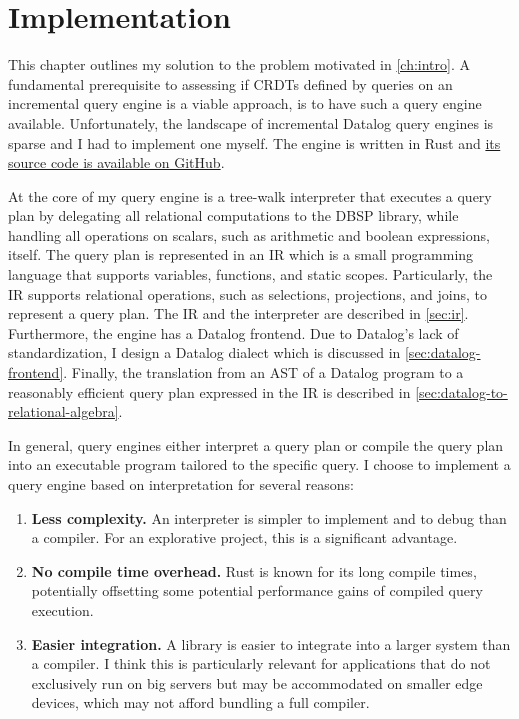 
\chapter{Implementation}\label{ch:implementation}

This chapter outlines my solution to the problem motivated in \ref{ch:intro}.
A fundamental prerequisite to assessing if \acp{CRDT} defined by queries on an
incremental query engine is a viable approach, is to have such a query
engine available.
Unfortunately, the landscape of incremental Datalog query engines is sparse
and I had to implement one myself.
The engine is written in Rust and \href{https://github.com/lstwn/masterthesis}{%
its source code is available on GitHub}\footnotemark{}.


At the core of my query engine is a tree-walk interpreter that executes a
query plan by delegating all relational computations to the DBSP library,
while handling all operations on scalars, such as arithmetic and boolean
expressions, itself.
The query plan is represented in an \acf{IR} which is a small programming
language that supports variables, functions, and static scopes.
Particularly, the \ac{IR} supports relational operations,
such as selections, projections, and joins, to represent a query plan.
The \ac{IR} and the interpreter are described in \ref{sec:ir}.
Furthermore, the engine has a Datalog frontend.
Due to Datalog's lack of standardization, I design a Datalog dialect which is
discussed in \ref{sec:datalog-frontend}.
Finally, the translation from an \ac{AST} of a Datalog program to a reasonably
efficient query plan expressed in the \ac{IR} is described
in \ref{sec:datalog-to-relational-algebra}.

In general, query engines either interpret a query plan or compile the query
plan into an executable program tailored to the specific query.
I choose to implement a query engine based on interpretation for several
reasons:

\begin{enumerate}
    \item \textbf{Less complexity.}
          An interpreter is simpler to implement and to debug than a compiler.
          For an explorative project, this is a significant advantage.
    \item \textbf{No compile time overhead.}
          Rust is known for its long compile times, potentially offsetting some
          potential performance gains of compiled query execution.
    \item \textbf{Easier integration.}
          A library is easier to integrate into a larger system than a compiler.
          I think this is particularly relevant for applications that do not
          exclusively run on big servers but may be accommodated on smaller
          edge devices, which may not afford bundling a full compiler.
\end{enumerate}


